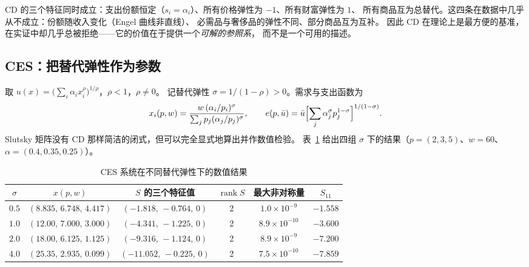 \begin{remark}
CD 的三个特征同时成立：支出份额恒定（$s_i=\alpha_i$）、所有价格弹性为 $-1$、所有财富弹性为 $1$、
所有商品互为总替代。这四条在数据中几乎从不成立：份额随收入变化（Engel 曲线非直线）、
必需品与奢侈品的弹性不同、部分商品互为互补。
因此 CD 在理论上是最方便的基准，在实证中却几乎总被拒绝——它的价值在于提供一个\emph{可解的参照系}，
而不是一个可用的描述。
\end{remark}

\subsection{CES：把替代弹性作为参数}

取 $u(x)=\bigl(\sum_i\alpha_ix_i^{\rho}\bigr)^{1/\rho}$，$\rho<1$，$\rho\ne0$。
记替代弹性 $\sigma=1/(1-\rho)>0$。需求与支出函数为
\[
 x_i(p,w)=\frac{w\,(\alpha_i/p_i)^{\sigma}}{\sum_j p_j(\alpha_j/p_j)^{\sigma}},
 \qquad
 e(p,\bar u)=\bar u\Bigl[\sum_j\alpha_j^{\sigma}p_j^{1-\sigma}\Bigr]^{1/(1-\sigma)}.
\]
Slutsky 矩阵没有 CD 那样简洁的闭式，但可以完全显式地算出并作数值检验。
表~\ref{tab:ces} 给出四组 $\sigma$ 下的结果（$p=(2,3,5)$、$w=60$、$\alpha=(0.4,0.35,0.25)$）。

\begin{table}[H]
\centering
\caption{CES 系统在不同替代弹性下的数值结果}\label{tab:ces}
\footnotesize
\begin{tabular}{cccccc}
\toprule
$\sigma$ & $x(p,w)$ & $S$ 的三个特征值 & $\operatorname{rank}S$ & 最大非对称量 & $S_{11}$\\
\midrule
$0.5$ & $(8.835,\,6.748,\,4.417)$ & $(-1.818,\,-0.764,\,0)$ & 2 & $1.0\times10^{-9}$ & $-1.558$\\
$1.0$ & $(12.00,\,7.000,\,3.000)$ & $(-4.341,\,-1.225,\,0)$ & 2 & $8.9\times10^{-10}$ & $-3.600$\\
$2.0$ & $(18.00,\,6.125,\,1.125)$ & $(-9.316,\,-1.124,\,0)$ & 2 & $8.9\times10^{-9}$ & $-7.200$\\
$4.0$ & $(25.35,\,2.935,\,0.099)$ & $(-11.052,\,-0.225,\,0)$ & 2 & $7.5\times10^{-10}$ & $-7.859$\\
\bottomrule
\end{tabular}
\end{table}

